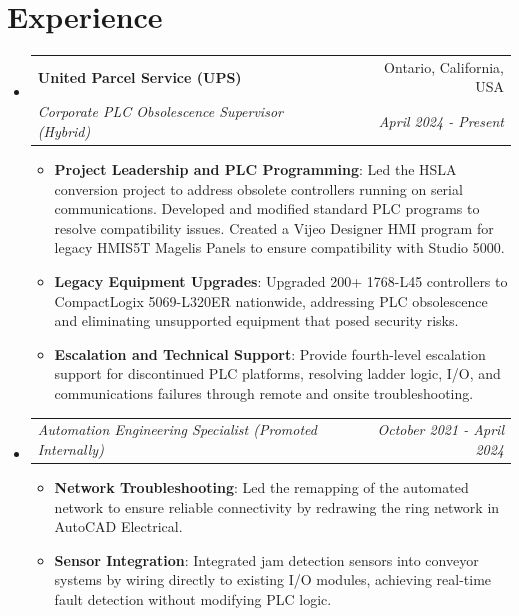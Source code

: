 \documentclass[a4paper,20pt]{article}
\makeatletter
\newcommand{\resumeItem}[2]{
  \item\small{
    \textbf{#1}{: #2 \vspace{-2pt}}
  }
}
\newcommand{\resumeSubheading}[4]{
  \vspace{-1pt}\item[]
    \begin{tabular*}{0.97\textwidth}{l@{\extracolsep{\fill}}r}
      \textbf{#1} & #2 \\
      \textit{#3} & \textit{#4} \\
    \end{tabular*}\vspace{-5pt}
}
\newcommand{\resumeRoleSubheading}[2]{
  \vspace{-1pt}\item[]
    \begin{tabular*}{0.97\textwidth}{l@{\extracolsep{\fill}}r}
      \textit{#1} & \textit{#2} \\
    \end{tabular*}\vspace{-5pt}
}
\newcommand{\resumeSubHeadingListStart}{\begin{itemize}[leftmargin=*]}
\newcommand{\resumeSubHeadingListEnd}{\end{itemize}}
\newcommand{\resumeItemListStart}{\begin{itemize}}
\newcommand{\resumeItemListEnd}{\end{itemize}\vspace{-4pt}}
\makeatother
\begin{document}
\section{Experience}
  \resumeSubHeadingListStart
    \resumeSubheading{United Parcel Service (UPS)}{Ontario, California, USA}
    {Corporate PLC Obsolescence Supervisor (Hybrid)}{April 2024 - Present}
    \vspace{-5pt}
    \resumeItemListStart
          \resumeItem{Project Leadership and PLC Programming}{Led the HSLA conversion project to address obsolete controllers running on serial communications. Developed and modified standard PLC programs to resolve compatibility issues. Created a Vijeo Designer HMI program for legacy HMIS5T Magelis Panels to ensure compatibility with Studio 5000.}
          \resumeItem{Legacy Equipment Upgrades}{Upgraded 200+ 1768-L45 controllers to CompactLogix 5069-L320ER nationwide, addressing PLC obsolescence and eliminating unsupported equipment that posed security risks.}
          \resumeItem{Escalation and Technical Support}{Provide fourth-level escalation support for discontinued PLC platforms, resolving ladder logic, I/O, and communications failures through remote and onsite troubleshooting.}
      \resumeItemListEnd

    \resumeRoleSubheading
      {Automation Engineering Specialist (Promoted Internally)}{October 2021 - April 2024}
    \resumeItemListStart
      \resumeItem{Network Troubleshooting}{Led the remapping of the automated network to ensure reliable connectivity by redrawing the ring network in AutoCAD Electrical.}
      \resumeItem{Sensor Integration}{Integrated jam detection sensors into conveyor systems by wiring directly to existing I/O modules, achieving real-time fault detection without modifying PLC logic.}
    \resumeItemListEnd
        

\resumeSubHeadingListEnd
\end{document}
